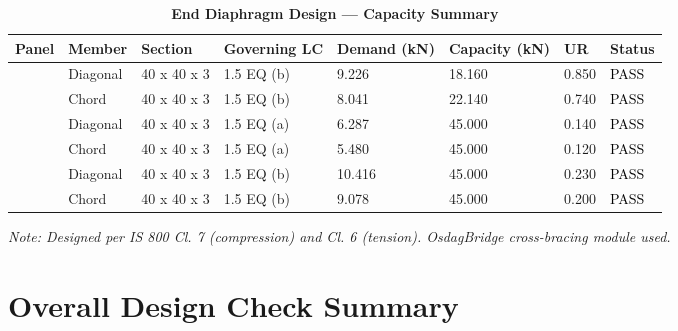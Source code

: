 \documentclass[12pt,a4paper]{report}
\numberwithin{table}{chapter}
\numberwithin{figure}{chapter}
\begin{document}
\vspace{1em}

\begin{longtable}{|C{2.0cm}|L{1.8cm}|C{2.2cm}|C{3.0cm}|C{1.8cm}|C{1.8cm}|C{1.2cm}|C{1.8cm}|}
\caption{\textbf{End Diaphragm Design --- Capacity Summary}}
\hline
\textbf{Panel} & \textbf{Member} & \textbf{Section} & \textbf{Governing LC} & \textbf{Demand (kN)} & \textbf{Capacity (kN)} & \textbf{UR} & \textbf{Status} \\[6pt]
\hline
{} & Diagonal & 40 x 40 x 3 & 1.5 EQ (b) & 9.226 & 18.160 & 0.850 & \textcolor{black}{PASS} \\[6pt]
 & Chord & 40 x 40 x 3 & 1.5 EQ (b) & 8.041 & 22.140 & 0.740 & \textcolor{black}{PASS} \\[6pt]
\hline
{} & Diagonal & 40 x 40 x 3 & 1.5 EQ (a) & 6.287 & 45.000 & 0.140 & \textcolor{black}{PASS} \\[6pt]
 & Chord & 40 x 40 x 3 & 1.5 EQ (a) & 5.480 & 45.000 & 0.120 & \textcolor{black}{PASS} \\[6pt]
\hline
{} & Diagonal & 40 x 40 x 3 & 1.5 EQ (b) & 10.416 & 45.000 & 0.230 & \textcolor{black}{PASS} \\[6pt]
 & Chord & 40 x 40 x 3 & 1.5 EQ (b) & 9.078 & 45.000 & 0.200 & \textcolor{black}{PASS} \\[6pt]
\hline
\end{longtable}
\noindent\textit{Note: Designed per IS 800 Cl. 7 (compression) and Cl. 6 (tension). OsdagBridge cross-bracing module used.}

\section{Overall Design Check Summary}
\label{sec:overall-summary}
\end{document}
